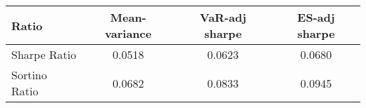 \begin{tabular}{lccc}
\toprule
Ratio & Mean-variance & VaR-adj sharpe & ES-adj sharpe\\
\midrule
Sharpe Ratio & 0.0518 & 0.0623 & 0.0680\\
Sortino Ratio & 0.0682 & 0.0833 & 0.0945\\
\bottomrule
\end{tabular}
